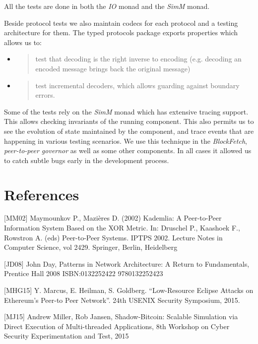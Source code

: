 \documentclass[11pt,a4paper]{article}
\begin{document}
All the tests are done in both the \emph{IO} monad and the \emph{SimM}
monad.

Beside protocol tests we also maintain codecs for each protocol and a
testing architecture for them. The typed protocols package exports
properties which allows us to:

\begin{itemize}
\item
  \begin{quote}
  test that decoding is the right inverse to encoding (e.g. decoding an
  encoded message brings back the original message)
  \end{quote}
\item
  \begin{quote}
  test incremental decoders, which allows guarding against boundary
  errors.
  \end{quote}
\end{itemize}

Some of the tests rely on the \emph{SimM} monad which has extensive
tracing support. This allows checking invariants of the running
component. This also permits us to see the evolution of state maintained
by the component, and trace events that are happening in various testing
scenarios. We use this technique in the \emph{BlockFetch},
\emph{peer-to-peer governor} as well as some other components. In all
cases it allowed us to catch subtle bugs early in the development
process.

\section{References}
\label{references}

{[}MM02{]} Maymounkov P., Mazières D. (2002) Kademlia: A Peer-to-Peer
Information System Based on the XOR Metric. In: Druschel P., Kaashoek
F., Rowstron A. (eds) Peer-to-Peer Systems. IPTPS 2002. Lecture Notes in
Computer Science, vol 2429. Springer, Berlin, Heidelberg

{[}JD08{]} John Day, Patterns in Network Architecture: A Return to
Fundamentals, Prentice Hall 2008 ISBN:0132252422 9780132252423

{[}MHG15{]} Y. Marcus, E. Heilman, S. Goldberg. ``Low-Resource Eclipse
Attacks on Ethereum's Peer-to Peer Network''. 24th USENIX Security
Symposium, 2015.

{[}MJ15{]} Andrew Miller, Rob Jansen, Shadow-Bitcoin: Scalable
Simulation via Direct Execution of Multi-threaded Applications, 8th
Workshop on Cyber Security Experimentation and Test, 2015
\end{document}
